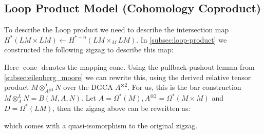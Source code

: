 \documentclass{scrartcl}
\theoremstyle{plain}
\theoremstyle{definition}
\DeclareMathOperator{\cone}{cone}
\newcommand{\quiso}{\simeq}
\newcommand{\from}{\leftarrow}
\DeclareMathOperator{\cConf}{\overline{Conf}}
\begin{document}
\subsection{Loop Product Model (Cohomology Coproduct)}\label{subsec:loop-product-model}
To describe the Loop product we need to describe the intersection map $H^*(LM\times LM) \from H^{*-n}(LM\times_M LM)$. In \ref{subsec:loop-product} we constructed the following zigzag to describe this map:
\begin{center}
\end{center}
Here $\cone$ denotes the mapping cone. Using the pullback-pushout lemma from \cref{subsec:eilenberg_moore} we can rewrite this, using the derived relative tensor product $M\otimes^L_{A^{\otimes 2}}N$ over the DGCA $A^{\otimes 2}$. For us, this is the bar construction $M\otimes^L_A N = B(M, A, N)$. Let $A=\Omega^*(M), A^{\otimes 2} = \Omega^*(M\times M)$ and $D = \Omega^*(LM)$, then the zigzag above can be rewritten as: 
\begin{center}
\end{center}
which comes with a quasi-isomorphism to the original zigzag. 
\end{document}
